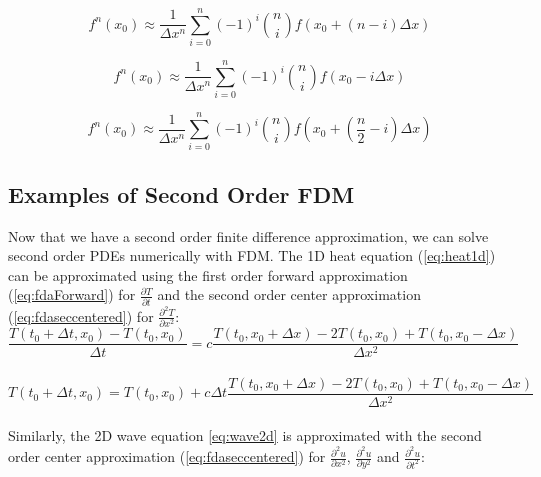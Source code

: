 {  \begin{equation}\label{eq:generalFDAForward}
 f^{n}(x_{0}) \approx \frac{1}{\Delta  x^{n}}\sum_{i=0}^{n}(-1)^{i}\binom {n} {i}f(x_{0} + (n-i)\Delta  x)
 \end{equation}
 
 \begin{equation}\label{eq:generalFDABackward}
 f^{n}(x_{0}) \approx \frac{1}{\Delta  x^{n}}\sum_{i=0}^{n}(-1)^{i}\binom {n} {i}f(x_{0} - i\Delta  x)
 \end{equation}
 
  \begin{equation}\label{eq:generalFDACenter}
 f^{n}(x_{0}) \approx \frac{1}{\Delta  x^{n}}\sum_{i=0}^{n}(-1)^{i}\binom {n} {i}f(x_{0} + \left(\frac{n}{2}-i\right)\Delta  x)
 \end{equation}
 
\subsection{Examples of Second Order FDM}\label{sec:secondOrderExamples}

Now that we have a second order finite difference approximation, we can solve second order PDEs numerically with FDM.  The 1D heat equation (\ref{eq:heat1d}) can be approximated using the first order forward approximation (\ref{eq:fdaForward}) for $\frac{\partial T}{\partial t}$ and the second order center approximation (\ref{eq:fdaseccentered}) for $\frac{\partial^{2} T}{\partial x^{2}}$:\\

 \begin{equation}
  \frac{T(t_{0} + \Delta  t, x_{0}) - T(t_{0}, x_{0})}{\Delta  t} = c\frac{T(t_{0},x_{0} + \Delta  x)- 2T(t_{0},x_{0}) + T(t_{0},x_{0} -\Delta  x)}{\Delta  x^{2}}
  \end{equation}
\\
 \begin{equation}\label{eq:heatfda1D}
  T(t_{0} + \Delta  t, x_{0}) = T(t_{0}, x_{0}) + c\Delta  t\frac{T(t_{0},x_{0} + \Delta  x) - 2T(t_{0},x_{0}) + T(t_{0},x_{0} -\Delta  x)}{\Delta  x^{2}}
  \end{equation}
\\
Similarly, the 2D wave equation \ref{eq:wave2d} is approximated with the second order center approximation (\ref{eq:fdaseccentered}) for $\frac{\partial^{2} u}{\partial x^{2}}$, $\frac{\partial^{2} u}{\partial y^{2}}$ and $\frac{\partial^{2} u}{\partial t^{2}}$:

}
